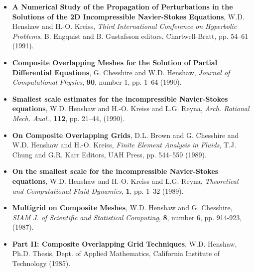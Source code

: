 \documentclass{article}
\begin{document}
\begin{itemize}
  \item  {\bf A Numerical Study of the Propagation of Perturbations in the Solutions of the 
        2D Incompressible {N}avier-{S}tokes Equations},
         W.D. Henshaw and H.-O. Kreiss,
         {\em Third International Conference on Hyperbolic Problems},
             B. Engquist and B. Gustafsson editors, Chartwell-Bratt, pp. 54--61 (1991).


  \item {\bf Composite Overlapping Meshes for the Solution of Partial Differential Equations},
      G. Chesshire and W.D. Henshaw, {\em Journal of Computational Physics}, {\bf 90}, number 1, pp. 1--64 (1990).

  \item {\bf Smallest scale estimates for the incompressible {Navier-Stokes} equations},
   W.D. Henshaw and H.-O. Kreiss and L.G. Reyna,
   {\em Arch. Rational Mech. Anal.}, {\bf 112}, pp. 21--44, (1990).

  \item {\bf On Composite Overlapping Grids}, D.L. Brown and G. Chesshire and W.D. Henshaw and H.-O. Kreiss,
    {\em Finite Element Analysis in Fluids}, T.J. Chung and G.R. Karr Editors, UAH Press, pp. 544--559 (1989).

  \item {\bf On the smallest scale for the incompressible {Navier-Stokes} equations},
         W.D. Henshaw and H.-O. Kreiss and L.G. Reyna,
         {\em Theoretical and Computational Fluid Dynamics}, {\bf 1}, pp. 1--32 (1989).


  \item{\bf Multigrid on Composite Meshes}, W.D. Henshaw and G. Chesshire,
          {\em SIAM J. of Scientific and Statistical Computing}, {\bf 8}, number 6, pp. 914-923, (1987).

  \item {\bf Part {II}: Composite Overlapping Grid Techniques}, W.D. Henshaw,
        Ph.D. Thesis, Dept. of Applied Mathematics, California Institute of Technology (1985).

\end{itemize}
\end{document}
